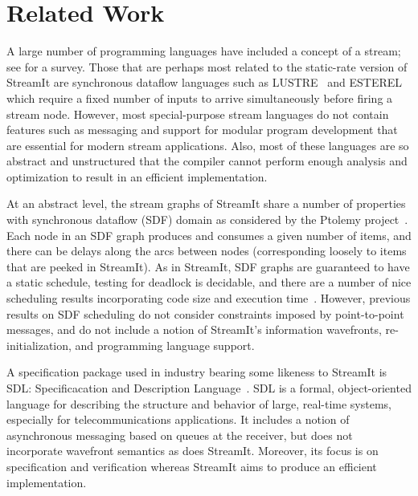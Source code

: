 \section{Related Work}
\label{sec:related}
A large number of programming languages have included a concept of a
stream; see \cite{survey97} for a survey.  Those that are perhaps most
related to the static-rate version of StreamIt are synchronous
dataflow languages such as LUSTRE~\cite{lustre} and
ESTEREL~\cite{esterel92} which require a fixed number of inputs to
arrive simultaneously before firing a stream node.  However, most
special-purpose stream languages do not contain features such as
messaging and support for modular program development that are
essential for modern stream applications.  Also, most of these
languages are so abstract and unstructured that the compiler cannot
perform enough analysis and optimization to result in an efficient
implementation.

At an abstract level, the stream graphs of StreamIt share a number of
properties with synchronous dataflow (SDF) domain as considered by the
Ptolemy project~\cite{ptolemyoverview}.  Each node in an SDF graph
produces and consumes a given number of items, and there can be delays
along the arcs between nodes (corresponding loosely to items that are
peeked in StreamIt).  As in StreamIt, SDF graphs are guaranteed to
have a static schedule, testing for deadlock is decidable, and there
are a number of nice scheduling results incorporating code size and
execution time~\cite{leesdf}.  However, previous results on SDF
scheduling do not consider constraints imposed by point-to-point
messages, and do not include a notion of StreamIt's information
wavefronts, re-initialization, and programming language support.

A specification package used in industry bearing some likeness to
StreamIt is SDL: Specificacation and Description
Language~\cite{sdlrec}.  SDL is a formal, object-oriented language for
describing the structure and behavior of large, real-time systems,
especially for telecommunications applications.  It includes a notion
of asynchronous messaging based on queues at the receiver, but does
not incorporate wavefront semantics as does StreamIt.  Moreover, its
focus is on specification and verification whereas StreamIt aims to
produce an efficient implementation.


